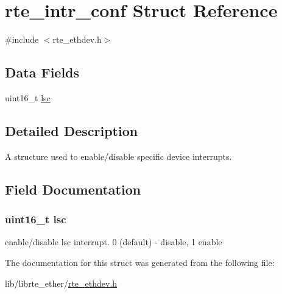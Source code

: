 \hypertarget{structrte__intr__conf}{}\section{rte\+\_\+intr\+\_\+conf Struct Reference}
\label{structrte__intr__conf}


{\ttfamily \#include $<$rte\+\_\+ethdev.\+h$>$}

\subsection*{Data Fields}
\begin{DoxyCompactItemize}
\item 
uint16\+\_\+t \hyperlink{structrte__intr__conf_afd989f6332d9125012d363b13aef3934}{lsc}
\end{DoxyCompactItemize}


\subsection{Detailed Description}
A structure used to enable/disable specific device interrupts. 

\subsection{Field Documentation}
\hypertarget{structrte__intr__conf_afd989f6332d9125012d363b13aef3934}{}
\subsubsection[{lsc}]{\setlength{\rightskip}{0pt plus 5cm}uint16\+\_\+t lsc}\label{structrte__intr__conf_afd989f6332d9125012d363b13aef3934}
enable/disable lsc interrupt. 0 (default) -\/ disable, 1 enable 

The documentation for this struct was generated from the following file\+:\begin{DoxyCompactItemize}
\item 
lib/librte\+\_\+ether/\hyperlink{rte__ethdev_8h}{rte\+\_\+ethdev.\+h}\end{DoxyCompactItemize}
